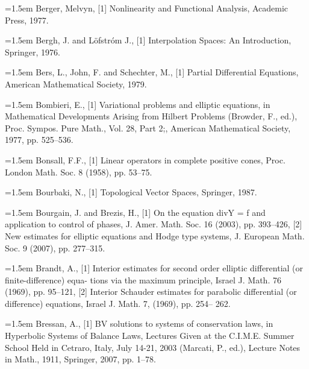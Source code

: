 \noindent\hangindent=1.5em Berger, Melvyn, \hypertarget{ref:Berger-1}{[1]} Nonlinearity and Functional Analysis, Academic Press, 1977.\par{}
\noindent\hangindent=1.5em Bergh, J. and Löfstróm J., \hypertarget{ref:BerghLofstrom-1}{[1]} Interpolation Spaces: An Introduction, Springer, 1976.\par{}
\noindent\hangindent=1.5em Bers, L., John, F. and Schechter, M., \hypertarget{ref:BersJohnSchechter-1}{[1]} Partial Differential Equations, American Mathematical Society, 1979.\par{}
\noindent\hangindent=1.5em Bombieri, E., \hypertarget{ref:Bombieri-1}{[1]} Variational problems and elliptic equations, in Mathematical Developments Arising from Hilbert Problems (Browder, F., ed.), Proc. Sympos. Pure Math., Vol. 28, Part 2;, American Mathematical Society, 1977, pp. 525--536.\par{}
\noindent\hangindent=1.5em Bonsall, F.F., \hypertarget{ref:Bonsall-1}{[1]} Linear operators in complete positive cones, Proc. London Math. Soc. 8 (1958), pp. 53--75.\par{}
\noindent\hangindent=1.5em Bourbaki, N., \hypertarget{ref:Bourbaki-1}{[1]} Topological Vector Spaces, Springer, 1987.\par{}
\noindent\hangindent=1.5em Bourgain, J. and Brezis, H., \hypertarget{ref:BourgainBrezis-1}{[1]} On the equation divY = f and application to control of phases, J. Amer. Math. Soc. 16 (2003), pp. 393--426, \hypertarget{ref:BourgainBrezis-2}{[2]} New estimates for elliptic equations and Hodge type systems, J. European Math. Soc. 9 (2007), pp. 277--315.\par{}
\noindent\hangindent=1.5em Brandt, A., \hypertarget{ref:Brandt-1}{[1]} Interior estimates for second order elliptic differential (or finite-difference) equa- tions via the maximum principle, Israel J. Math. 76 (1969), pp. 95--121, \hypertarget{ref:Brandt-2}{[2]} Interior Schauder estimates for parabolic differential (or difference) equations, Israel J. Math. 7, (1969), pp. 254-- 262.\par{}
\noindent\hangindent=1.5em Bressan, A., \hypertarget{ref:Bressan-1}{[1]} BV solutions to systems of conservation laws, in Hyperbolic Systems of Balance Laws, Lectures Given at the C.I.M.E. Summer School Held in Cetraro, Italy, July 14-21, 2003 (Marcati, P., ed.), Lecture Notes in Math., 1911, Springer, 2007, pp. 1--78.\par{}
